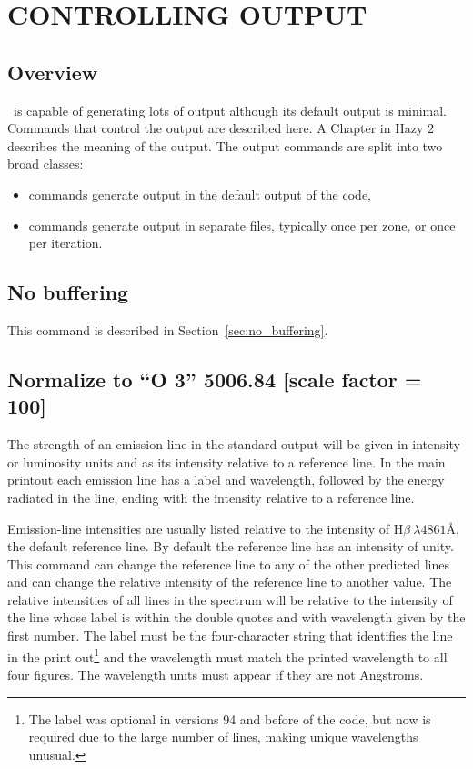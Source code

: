 \chapter{CONTROLLING OUTPUT}
\label{sec:ControllingOutput}

\section{Overview}

\Cloudy\ is capable of generating lots of output although its
default output is minimal.
Commands that control the output are described here.
A Chapter in Hazy 2
describes the meaning of the output.  The output commands are split into
two broad classes: 
\begin{itemize}
\item{} commands generate output in the
default output of the code, 
\item{} commands generate output in separate files, typically
once per zone, or once per iteration.
\end{itemize}

\section{No buffering}

This command is described in Section~\ref{sec:no_buffering}.

\section{Normalize to ``O  3'' 5006.84 [scale factor = 100]}

The strength of an emission line in the standard output will be given
in intensity or luminosity units and as its intensity relative to a reference
line.  In the main printout each emission line has a label and wavelength,
followed by the energy radiated in the line, ending with the intensity
relative to a reference line.

Emission-line intensities are usually listed relative to the intensity
of H$\beta\ \lambda 4861$\AA, the default reference line.  By default the reference line
has an intensity of unity.  This command can change the reference line to
any of the other predicted lines and can change the relative intensity of
the reference line to another value.  The relative intensities of all lines
in the spectrum will be relative to the intensity of the line whose label
is within the double quotes and with wavelength given by the first number.
The label must be the four-character string that identifies the line in
the print out\footnote{The label was optional in versions 94 and before of the code, but
now is required due to the large number of lines, making unique wavelengths
unusual.}
and the wavelength must match the printed wavelength to
all four figures.
The wavelength units must appear if they are not
Angstroms.

